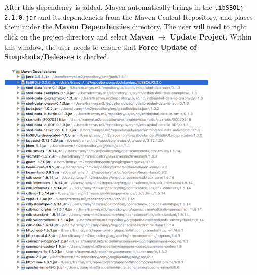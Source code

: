 After this dependency is added, Maven automatically brings in the  {\tt libSBOLj-2.1.0.jar} and its dependencies from the Maven Central Repository, and places them under the {\bf Maven Dependencies} directory. The user will need to right click on the project directory and select {\bf Maven $\rightarrow$ Update Project}. Within this window, the user needs to ensure that {\bf Force Update of Snapshots/Releases} is checked. 
\begin{center}
  \includegraphics[width=0.8\textwidth]{figures/addMavenDependency3}
\end{center}


